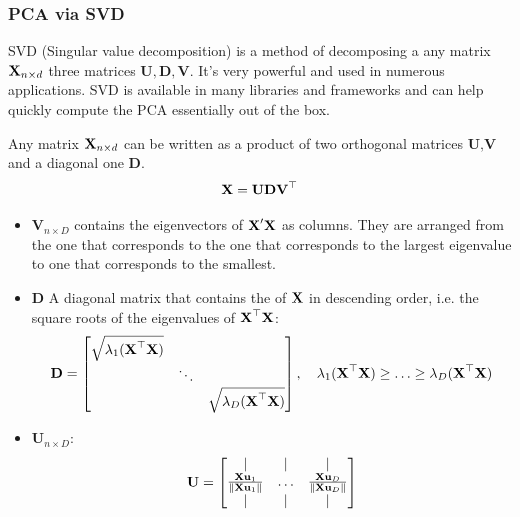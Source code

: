 \documentclass[a4paper]{article}
\begin{document}
% 

\subsubsection{PCA via SVD}

SVD (Singular value decomposition) is a method of decomposing a any matrix $\textbf{X}_{n\times d}$ three matrices $\textbf{U}, \textbf{D}, \textbf{V}$. It's very powerful and used in numerous applications. SVD is available in many libraries and frameworks and can help quickly compute the PCA essentially out of the box.
\begin{theorem}[SVD]
Any matrix $\textbf{X}_{n\times d}$ can be written as a product of two orthogonal matrices $\textbf{U},\textbf{V}$ and a diagonal one $\textbf{D}$.
\begin{equation}
    \textbf{X} = \textbf{U}\textbf{D}\textbf{V}^{\top}
\end{equation}
\begin{itemize}
    \item $\textbf{V}_{n\times D}$ contains the eigenvectors of $\textbf{X}'\textbf{X}$ as columns. They are arranged from the one that corresponds to the one that corresponds to the largest eigenvalue to one that corresponds to the smallest.
    \item $\textbf{D}$ A diagonal matrix that contains the  of $\textbf{X}$ in descending order, i.e. the square roots of the eigenvalues of $\textbf{X}^{\top}\textbf{X}$:
    \begin{equation}
        \textbf{D} =
        \begin{bmatrix}
        \sqrt{\lambda_1(\textbf{X}^{\top}\textbf{X})} & & \\
         & \ddots & \\
         & & \sqrt{\lambda_D(\textbf{X}^{\top}\textbf{X})}
        \end{bmatrix}, \quad \lambda_1(\textbf{X}^{\top}\textbf{X}) \geq \ldots \geq \lambda_D(\textbf{X}^{\top}\textbf{X})
    \end{equation}
    \item $\textbf{U}_{n\times D}$: 
    \begin{equation}
        \textbf{U} = \begin{bmatrix}
        | & | & | \\
        \frac{\textbf{X}\textbf{u}_1}{\left\lVert\textbf{X}\textbf{u}_1\right\rVert} & \ldots & \frac{\textbf{X}\textbf{u}_D}{\left\lVert\textbf{X}\textbf{u}_D\right\rVert}\\ 
        | & | & | 
        \end{bmatrix}
    \end{equation}
\end{itemize}
\end{theorem}
\end{document}
